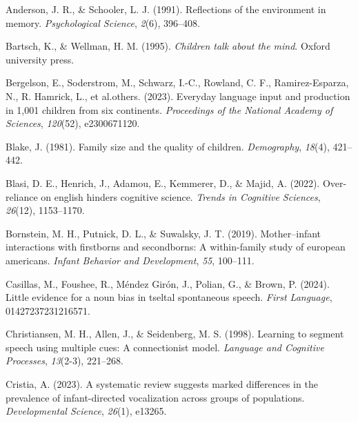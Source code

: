 \documentclass[
  man,floatsintext]{apa6}
\newlength{\cslhangindent}
\newlength{\cslentryspacingunit} %
\newenvironment{CSLReferences}[2] %
 {%
  \setlength{\parindent}{0pt}
  \ifodd #1
  \let\oldpar\par
  \def\par{\hangindent=\cslhangindent\oldpar}
  \fi
  \setlength{\parskip}{#2\cslentryspacingunit}
 }%
 {}
\begin{document}
\hypertarget{refs}{}
\begin{CSLReferences}{1}{0}
\leavevmode{}%
Anderson, J. R., \& Schooler, L. J. (1991). Reflections of the environment in memory. \emph{Psychological Science}, \emph{2}(6), 396--408.

\leavevmode{}%
Bartsch, K., \& Wellman, H. M. (1995). \emph{Children talk about the mind}. Oxford university press.

\leavevmode{}%
Bergelson, E., Soderstrom, M., Schwarz, I.-C., Rowland, C. F., Ramirez-Esparza, N., R. Hamrick, L., et al.others. (2023). Everyday language input and production in 1,001 children from six continents. \emph{Proceedings of the National Academy of Sciences}, \emph{120}(52), e2300671120.

\leavevmode{}%
Blake, J. (1981). Family size and the quality of children. \emph{Demography}, \emph{18}(4), 421--442.

\leavevmode{}%
Blasi, D. E., Henrich, J., Adamou, E., Kemmerer, D., \& Majid, A. (2022). Over-reliance on english hinders cognitive science. \emph{Trends in Cognitive Sciences}, \emph{26}(12), 1153--1170.

\leavevmode{}%
Bornstein, M. H., Putnick, D. L., \& Suwalsky, J. T. (2019). Mother--infant interactions with firstborns and secondborns: A within-family study of european americans. \emph{Infant Behavior and Development}, \emph{55}, 100--111.

\leavevmode{}%
Casillas, M., Foushee, R., Méndez Girón, J., Polian, G., \& Brown, P. (2024). Little evidence for a noun bias in tseltal spontaneous speech. \emph{First Language}, 01427237231216571.

\leavevmode{}%
Christiansen, M. H., Allen, J., \& Seidenberg, M. S. (1998). Learning to segment speech using multiple cues: A connectionist model. \emph{Language and Cognitive Processes}, \emph{13}(2-3), 221--268.

\leavevmode{}%
Cristia, A. (2023). A systematic review suggests marked differences in the prevalence of infant-directed vocalization across groups of populations. \emph{Developmental Science}, \emph{26}(1), e13265.


\end{CSLReferences}
\end{document}
